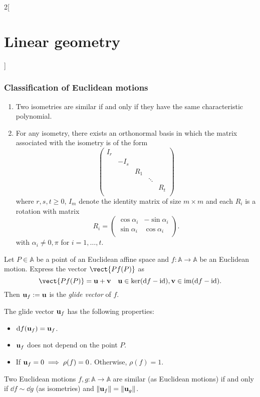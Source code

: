 \documentclass[../../../main.tex]{subfiles}
\begin{document}
\begin{multicols}{2}[\section{Linear geometry}]
  \subsubsection{Classification of Euclidean motions}
  \begin{theorem}
    \hfill
    \begin{enumerate}
      \item Two isometries are similar if and only if they have the same characteristic polynomial.
      \item For any isometry, there exists an orthonormal basis in which the matrix associated with the isometry is of the form  $$\begin{pmatrix}
                I_r &      &     &        &     \\
                    & -I_s &     &        &     \\
                    &      & R_1 &        &     \\
                    &      &     & \ddots &     \\
                    &      &     &        & R_t \\
              \end{pmatrix}$$ where $r,s,t\geq 0$, $I_m$ denote the identity matrix of size $m\times m$ and each $R_i$ is a rotation with matrix $$R_i=\begin{pmatrix}
                \cos\alpha_i & -\sin\alpha_i \\
                \sin\alpha_i & \cos\alpha_i  \\
              \end{pmatrix}.$$ with $\alpha_i\ne0,\pi$ for $i=1,\ldots,t$.
    \end{enumerate}
  \end{theorem}
  \begin{definition}
    Let $P\in\mathbb{A}$ be a point of an Euclidean affine space and $f:\mathbb{A}\rightarrow\mathbb{A}$ be an Euclidean motion. Express the vector $\vect{Pf(P)}$ as $$\vect{Pf(P)}=\vf{u}+\vf{v}\quad\vf{u}\in\ker(\dd{f}-\id),\vf{v}\in\im(\dd{f}-\id).$$ Then $\boldsymbol{\mathrm{u}}_f:=\boldsymbol{\mathrm{u}}$ is the \emph{glide vector} of $f$.
  \end{definition}
  \begin{proposition}
    The glide vector $\boldsymbol{\mathrm{u}}_f$ has the following properties:
    \begin{itemize}
      \item $\dd{f(\boldsymbol{\mathrm{u}}_f)}=\boldsymbol{\mathrm{u}}_f$.
      \item $\boldsymbol{\mathrm{u}}_f$ does not depend on the point $P$.
      \item If $\boldsymbol{\mathrm{u}}_f=0\implies\rho(f)=0$. Otherwise, $\rho(f)=1$.
    \end{itemize}
  \end{proposition}
  \begin{theorem}
    Two Euclidean motions $f,g:\mathbb{A}\rightarrow\mathbb{A}$ are similar (as Euclidean motions) if and only if $\dd{f}\sim \dd{g}$ (as isometries) and $\|\boldsymbol{\mathrm{u}}_f\|=\|\boldsymbol{\mathrm{u}}_g\|$.
  \end{theorem}

\end{multicols}
\end{document}
